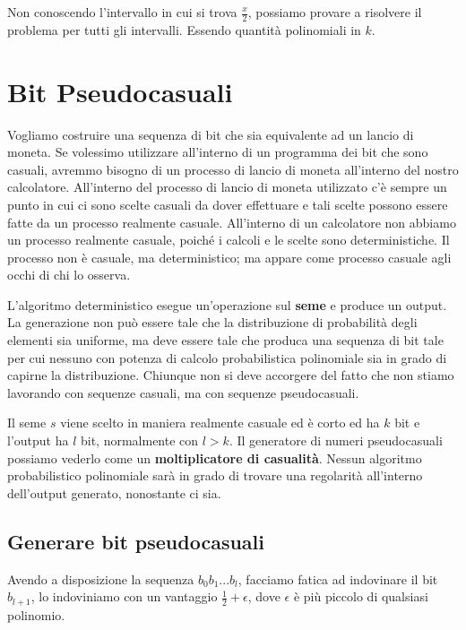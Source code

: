 Non conoscendo l'intervallo in cui si trova $\frac{x}{2}$, possiamo provare a risolvere il problema
per tutti gli intervalli. Essendo quantità polinomiali in $k$.

\section{Bit Pseudocasuali}
Vogliamo costruire una sequenza di bit che sia equivalente ad un 
lancio di moneta. Se volessimo utilizzare all'interno di un programma
dei bit che sono casuali, avremmo bisogno di un processo di lancio di moneta 
all'interno del nostro calcolatore. All'interno del processo di lancio 
di moneta utilizzato c'è sempre un punto in cui ci sono scelte casuali da 
dover effettuare e tali scelte possono essere fatte da un processo realmente 
casuale. All'interno di un calcolatore non abbiamo un processo
realmente casuale, poiché i calcoli e le scelte sono deterministiche.
Il processo non è casuale, ma deterministico; ma appare come processo 
casuale agli occhi di chi lo osserva.

L'algoritmo deterministico 
esegue un'operazione sul \textbf{seme} e produce un output.
La generazione non può essere tale che la distribuzione di probabilità degli elementi 
sia uniforme, ma deve essere tale che produca una sequenza di bit tale per cui 
nessuno con potenza di calcolo probabilistica polinomiale sia in grado di 
capirne la distribuzione. Chiunque non si deve accorgere del fatto che 
non stiamo lavorando con sequenze casuali, ma con sequenze pseudocasuali.
\begin{figure}[H]
  \centering
\end{figure}
Il seme $s$ viene scelto in maniera realmente casuale ed è corto ed ha $k$ bit e
l'output ha $l$ bit, normalmente con $l > k$. Il generatore di numeri pseudocasuali
possiamo vederlo come un \textbf{moltiplicatore di casualità}.
Nessun algoritmo probabilistico polinomiale sarà in grado di trovare 
una regolarità all'interno dell'output generato, nonostante ci sia.
\subsection{Generare bit pseudocasuali}
Avendo a disposizione la sequenza $b_0 b_1 ... b_l$, facciamo fatica ad 
indovinare il bit $b_{l+1}$, lo indoviniamo con un vantaggio $\frac{1}{2} + \epsilon$,
dove $\epsilon$ è più piccolo di qualsiasi polinomio.

